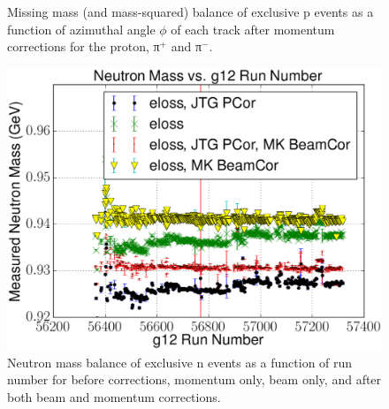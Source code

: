 \begin{figure}
\begin{center}
\begin{subfigure}{0.4\columnwidth}
\end{subfigure}
\caption[Momentum Balance Before Corrections]{\label{fig:mmbal}Missing mass (and mass-squared) balance of exclusive p \π[+] \π[-] events as a function of azimuthal angle $\phi$ of each track after momentum corrections for the proton, π$^+$ and π$^-$.}
\end{center}\end{figure}

\begin{figure}\begin{center}
\includegraphics[width=0.6\columnwidth]{figures/corrections/C3pi_allcorr_neutron_rxr.eps}
\caption[Run by run Mass Balance Before and After Corrections]{\label{fig:mbal_pcor}Neutron mass balance of exclusive n \π[+] \π[+] \π[-] events as a function of run number for before corrections, momentum only, beam only, and after both beam and momentum corrections.}
\end{center}\end{figure}


\FloatBarrier
